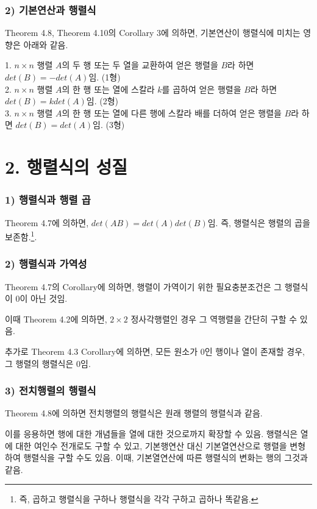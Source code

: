 \subsubsection*{2) 기본연산과 행렬식}
Theorem 4.8, Theorem 4.10의 Corollary 3에 의하면, 기본연산이 행렬식에 미치는 영향은 아래와 같음.

1. $n \times n$ 행렬 $A$의 두 행 또는 두 열을 교환하여 얻은 행렬을 $B$라 하면 $det(B)=-det(A)$임. (1형)\\
2. $n \times n$ 행렬 $A$의 한 행 또는 열에 스칼라 $k$를 곱하여 얻은 행렬을 $B$라 하면 $det(B)=kdet(A)$임. (2형)\\
3. $n \times n$ 행렬 $A$의 한 행 또는 열에 다른 행에 스칼라 배를 더하여 얻은 행렬을 $B$라 하면 $det(B)=det(A)$임. (3형)\\


\section*{2. 행렬식의 성질}
\subsubsection*{1) 행렬식과 행렬 곱}
Theorem 4.7에 의하면, $det(AB)=det(A)det(B)$임. 즉, 행렬식은 행렬의 곱을 보존함.\footnote{즉, 곱하고 행렬식을 구하나 행렬식을 각각 구하고 곱하나 똑같음.}.

\subsubsection*{2) 행렬식과 가역성}
Theorem 4.7의 Corollary에 의하면, 행렬이 가역이기 위한 필요충분조건은 그 행렬식이 0이 아닌 것임.

이때 Theorem 4.2에 의하면, $2 \times 2$ 정사각행렬인 경우 그 역행렬을 간단히 구할 수 있음.

추가로 Theorem 4.3 Corollary에 의하면, 모든 원소가 0인 행이나 열이 존재할 경우, 그 행렬의 행렬식은 0임.

\subsubsection*{3) 전치행렬의 행렬식}
Theorem 4.8에 의하면 전치행렬의 행렬식은 원래 행렬의 행렬식과 같음.

이를 응용하면 행에 대한 개념들을 열에 대한 것으로까지 확장할 수 있음. 행렬식은 열에 대한 여인수 전개로도 구할 수 있고, 기본행연산 대신 기본열연산으로 행렬을 변형하여 행렬식을 구할 수도 있음. 이때, 기본열연산에 따른 행렬식의 변화는 행의 그것과 같음.


